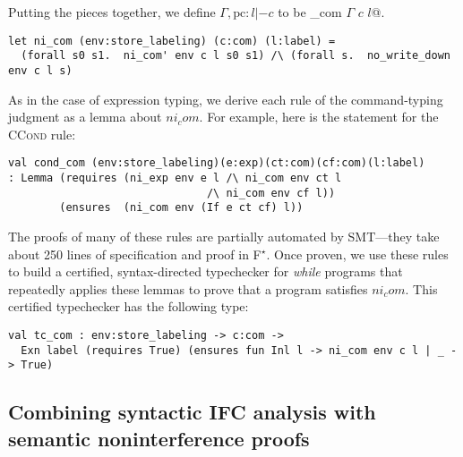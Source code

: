 \documentclass[sigplan,screen]{acmart}\settopmatter{}
\newcommand\fstar{F$^\star$\xspace}
\newcommand{\comm}[3]{\ifcheckpagebudget\else\ifdraft{\maybecolor{#1}[#2: #3]}\fi\fi}
\newcommand{\ch}[1]{\comm{teal}{CH}{#1}}
\newcommand{\nig}[1]{\comm{dkgreen}{Niklas}{#1}}
\begin{document}
\fi
Putting the pieces together, we define
%
$\Gamma, \text{pc}:l |- c$ to be \ls@ni_com $\Gamma$ $c$ $l$@.
%
\begin{lstlisting}
let ni_com (env:store_labeling) (c:com) (l:label) = 
  (forall s0 s1.  ni_com' env c l s0 s1) /\ (forall s.  no_write_down env c l s)
\end{lstlisting}

As in the case of expression typing, we derive each rule of the
command-typing judgment as a lemma about \ls$ni_com$. For example,
here is the statement for the \textsc{CCond} rule:

\begin{lstlisting}
val cond_com (env:store_labeling)(e:exp)(ct:com)(cf:com)(l:label)
: Lemma (requires (ni_exp env e l /\ ni_com env ct l 
                               /\ ni_com env cf l))
        (ensures  (ni_com env (If e ct cf) l))
\end{lstlisting}

\noindent The proofs of many of these rules
are partially automated by SMT---they take about 250 lines of
specification and proof in \fstar. Once proven, we use these rules to
build a certified, syntax-directed typechecker for \emph{while}
programs that repeatedly applies these lemmas to prove that
a program satisfies \ls$ni_com$. This \iffull certified \fi typechecker has the
following type:
%
\begin{lstlisting}
val tc_com : env:store_labeling -> c:com -> 
  Exn label (requires True) (ensures fun Inl l -> ni_com env c l | _ -> True)
\end{lstlisting}




\subsection{Combining syntactic IFC analysis with semantic noninterference proofs}
\label{sec:ifc-combining}
\end{document}
